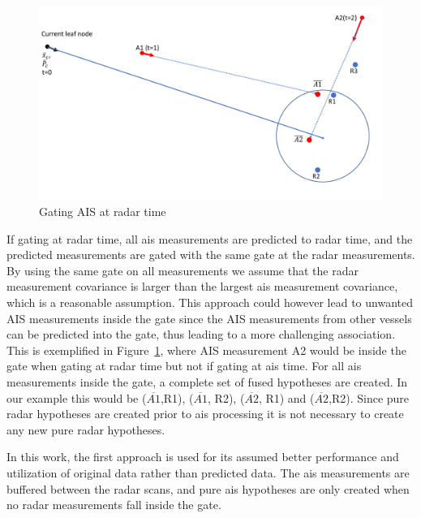 \begin{figure}[H]
\centering
\includegraphics[width = .8\textwidth]{Figures/gating_at_radar_time.pdf}
\caption{Gating AIS at radar time}\label{fig:gating_ais_at_radar_time}
\end{figure}
If gating at radar time, all \gls{ais} measurements are predicted to radar time, and the predicted measurements are gated with the same gate at the radar measurements. By using the same gate on all measurements we assume that the radar measurement covariance is larger than the largest \gls{ais} measurement covariance, which is a reasonable assumption. This approach could however lead to unwanted AIS measurements inside the gate since the AIS measurements from other vessels can be predicted into the gate, thus leading to a more challenging association. This is exemplified in Figure~\ref{fig:gating_ais_at_radar_time}, where AIS measurement A2 would be inside the gate when gating at radar time but not if gating at \gls{ais} time. For all \gls{ais} measurements inside the gate, a complete set of fused hypotheses are created. In our example this would be (\(\overline{A1}\),R1), (\(\overline{A1}\), R2), (\(\overline{A2}\), R1) and (\(\overline{A2}\),R2). Since pure radar hypotheses are created prior to \gls{ais} processing it is not necessary to create any new pure radar hypotheses. 

In this work, the first approach is used for its assumed better performance and utilization of original data rather than predicted data. The \gls{ais} measurements are buffered between the radar scans, and pure \gls{ais} hypotheses are only created when no radar measurements fall inside the gate.

